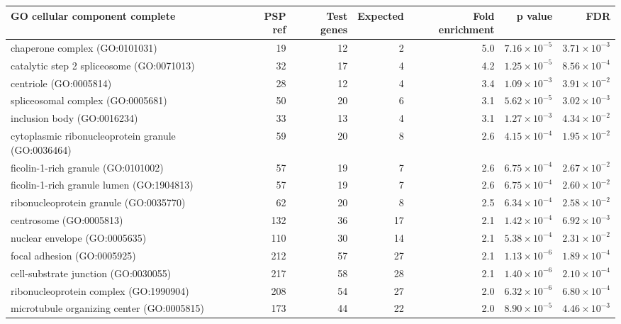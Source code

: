 \begin{table}[ht]
\centering
\begin{adjustbox}{width=\textwidth}

\begin{tabular}{lrrrrrr}
  \hline
GO cellular component complete & PSP ref & Test genes & Expected & Fold enrichment & p value & FDR \\ 
  \hline
chaperone complex (GO:0101031) & 19 & 12 & 2 & 5.0 & $7.16 \times 10^{-5}$ & $3.71 \times 10^{-3}$ \\ 
  catalytic step 2 spliceosome (GO:0071013) & 32 & 17 & 4 & 4.2 & $1.25 \times 10^{-5}$ & $8.56 \times 10^{-4}$ \\ 
  centriole (GO:0005814) & 28 & 12 & 4 & 3.4 & $1.09 \times 10^{-3}$ & $3.91 \times 10^{-2}$ \\ 
  spliceosomal complex (GO:0005681) & 50 & 20 & 6 & 3.1 & $5.62 \times 10^{-5}$ & $3.02 \times 10^{-3}$ \\ 
  inclusion body (GO:0016234) & 33 & 13 & 4 & 3.1 & $1.27 \times 10^{-3}$ & $4.34 \times 10^{-2}$ \\ 
  cytoplasmic ribonucleoprotein granule (GO:0036464) & 59 & 20 & 8 & 2.6 & $4.15 \times 10^{-4}$ & $1.95 \times 10^{-2}$ \\ 
  ficolin-1-rich granule (GO:0101002) & 57 & 19 & 7 & 2.6 & $6.75 \times 10^{-4}$ & $2.67 \times 10^{-2}$ \\ 
  ficolin-1-rich granule lumen (GO:1904813) & 57 & 19 & 7 & 2.6 & $6.75 \times 10^{-4}$ & $2.60 \times 10^{-2}$ \\ 
  ribonucleoprotein granule (GO:0035770) & 62 & 20 & 8 & 2.5 & $6.34 \times 10^{-4}$ & $2.58 \times 10^{-2}$ \\ 
  centrosome (GO:0005813) & 132 & 36 & 17 & 2.1 & $1.42 \times 10^{-4}$ & $6.92 \times 10^{-3}$ \\ 
  nuclear envelope (GO:0005635) & 110 & 30 & 14 & 2.1 & $5.38 \times 10^{-4}$ & $2.31 \times 10^{-2}$ \\ 
  focal adhesion (GO:0005925) & 212 & 57 & 27 & 2.1 & $1.13 \times 10^{-6}$ & $1.89 \times 10^{-4}$ \\ 
  cell-substrate junction (GO:0030055) & 217 & 58 & 28 & 2.1 & $1.40 \times 10^{-6}$ & $2.10 \times 10^{-4}$ \\ 
  ribonucleoprotein complex (GO:1990904) & 208 & 54 & 27 & 2.0 & $6.32 \times 10^{-6}$ & $6.80 \times 10^{-4}$ \\ 
  microtubule organizing center (GO:0005815) & 173 & 44 & 22 & 2.0 & $8.90 \times 10^{-5}$ & $4.46 \times 10^{-3}$ \\ 

\end{tabular}
\end{adjustbox}
\end{table}
